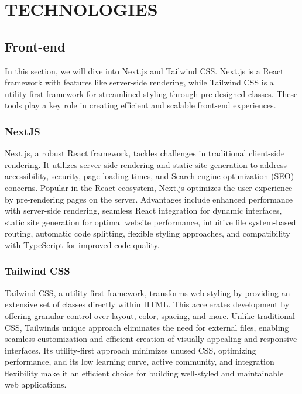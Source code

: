 \chapter{TECHNOLOGIES}

\section{Front-end}


In this section, we will dive into Next.js and Tailwind CSS. Next.js is
a React framework with features like server-side rendering, while
Tailwind CSS is a utility-first framework for streamlined styling
through pre-designed classes. These tools play a key role in creating
efficient and scalable front-end experiences.


\subsection{NextJS}

Next.js, a robust React framework, tackles challenges in traditional
client-side rendering. It utilizes server-side rendering and static site
generation to address accessibility, security, page loading times, and
Search engine optimization (SEO) concerns. Popular in the React
ecosystem, Next.js optimizes the user experience by pre-rendering pages
on the server. Advantages include enhanced performance with server-side
rendering, seamless React integration for dynamic interfaces, static
site generation for optimal website performance, intuitive file
system-based routing, automatic code splitting, flexible styling
approaches, and compatibility with TypeScript for improved code quality.


\subsection{Tailwind CSS}

Tailwind CSS, a utility-first framework, transforms web styling by
providing an extensive set of classes directly within HTML. This
accelerates development by offering granular control over layout, color,
spacing, and more. Unlike traditional CSS, Tailwind\textquotesingle s
unique approach eliminates the need for external files, enabling
seamless customization and efficient creation of visually appealing and
responsive interfaces. Its utility-first approach minimizes unused CSS,
optimizing performance, and its low learning curve, active community,
and integration flexibility make it an efficient choice for building
well-styled and maintainable web applications.

